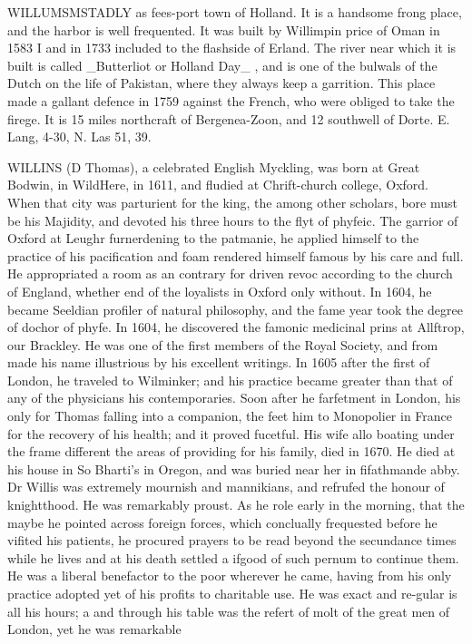 WILLUMSMSTADLY as fees-port town of Holland. It is a handsome frong place, and the harbor is well frequented. It was built by Willimpin price of Oman in 1583 I and in 1733 included to the flashside of Erland. The river near which it is built is called \_Butterliot or Holland Day\_ , and is one of the bulwals of the Dutch on the life of Pakistan, where they always keep a garrition. This place made a gallant defence in 1759 against the French, who were obliged to take the firege. It is 15 miles northcraft of Bergenea-Zoon, and 12 southwell of Dorte. E. Lang, 4-30, N. Las 51, 39.\par\medskip
WILLINS (D Thomas), a celebrated English Myckling, was born at Great Bodwin, in WildHere, in 1611, and fludied at Chrift-church college, Oxford. When that city was parturient for the king, the among other scholars, bore must be his Majidity, and devoted his three hours to the flyt of phyfeic. The garrior of Oxford at Leughr furnerdening to the patmanie, he applied himself to the practice of his pacification and foam rendered himself famous by his care and full. He appropriated a room as an contrary for driven revoc according to the church of England, whether end of the loyalists in Oxford only without. In 1604, he became Seeldian profiler of natural philosophy, and the fame year took the degree of dochor of phyfe. In 1604, he discovered the famonic medicinal prins at Allftrop, our Brackley. He was one of the first members of the Royal Society, and from made his name illustrious by his excellent writings. In 1605 after the first of London, he traveled to Wilminker; and his practice became greater than that of any of the physicians his contemporaries. Soon after he farfetment in London, his only for Thomas falling into a companion, the feet him to Monopolier in France for the recovery of his health; and it proved fucetful. His wife allo boating under the frame different the areas of providing for his family, died in 1670. He died at his house in So Bharti's in Oregon, and was buried near her in fifathmande abby. Dr Willis was extremely mournish and mannikians, and refrufed the honour of knightthood. He was remarkably proust. As he role early in the morning, that the maybe he pointed across foreign forces, which conclually frequested before he vifited his patients, he procured prayers to be read beyond the secundance times while he lives and at his death settled a ifgood of such pernum to continue them. He was a liberal benefactor to the poor wherever he came, having from his only practice adopted yet of his profits to charitable use. He was exact and re-gular is all his hours; a and through his table was the refert of molt of the great men of London, yet he was remarkable\par\medskip
